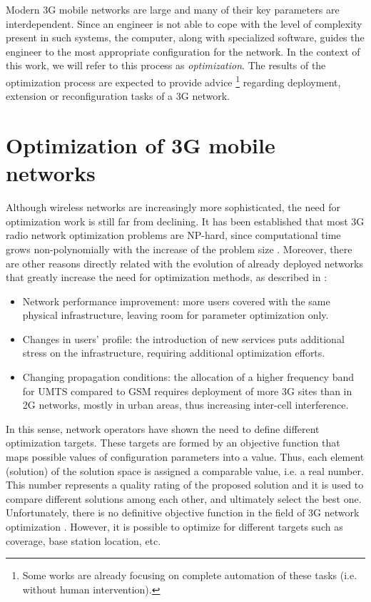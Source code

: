 Modern 3G mobile networks are large and many of their key parameters
are interdependent. Since an engineer is not able to cope with the
level of complexity present in such systems, the computer, along with
specialized software, guides the engineer to the most appropriate
configuration for the network. In the context of this work, we will
refer to this process as \emph{optimization}. The results of the optimization
process are expected to provide advice%
\footnote{Some works are already focusing on complete automation of these tasks
(i.e. without human intervention).%
} regarding deployment, extension or reconfiguration tasks of a 3G
network.


\section{Optimization of 3G mobile networks}

Although wireless networks are increasingly more sophisticated, the
need for optimization work is still far from declining. It has been
established that most 3G radio network optimization problems are NP-hard,
since computational time grows non-polynomially with the increase
of the problem size \cite{amaldi:planning.umts.base.station.location}.
Moreover, there are other reasons directly related with the evolution
of already deployed networks that greatly increase the need for optimization
methods, as described in \cite{nawrocki2006understanding}:
\begin{itemize}
\item Network performance improvement: more users covered with the same
physical infrastructure, leaving room for parameter optimization only.
\item Changes in users\textquoteright{} profile: the introduction of new
services puts additional stress on the infrastructure, requiring additional
optimization efforts.
\item Changing propagation conditions: the allocation of a higher frequency
band for UMTS compared to GSM requires deployment of more 3G sites
than in 2G networks, mostly in urban areas, thus increasing inter-cell
interference.
\end{itemize}
In this sense, network operators have shown the need to define different
optimization targets. These targets are formed by an objective function
that maps possible values of configuration parameters into a value.
Thus, each element (solution) of the solution space is assigned a
comparable value, i.e. a real number. This number represents a quality
rating of the proposed solution and it is used to compare different
solutions among each other, and ultimately select the best one. Unfortunately,
there is no definitive objective function in the field of 3G network
optimization \cite{nawrocki2006understanding}. However, it is possible
to optimize for different targets such as coverage, base station location,
etc.

